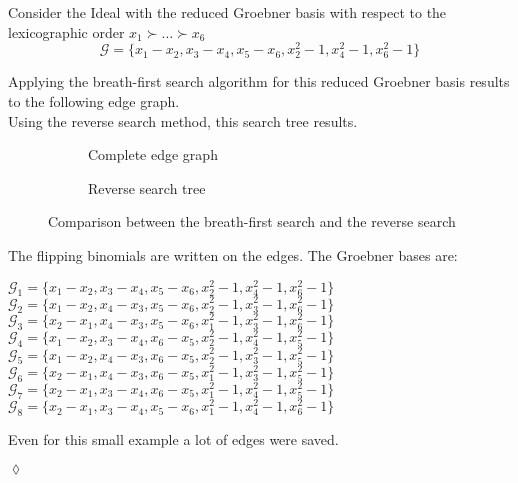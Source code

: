 \begin{env_example}\normalfont
Consider the Ideal with the reduced Groebner basis with respect to the lexicographic order $x_{1} \succ \ldots \succ x_{6} $
\[ \mathcal{G} = \{x_{1} - x_{2}, x_{3} - x_{4}, x_{5}-x_{6} , x_{2}^{2} -1 , x_{4}^{2} - 1, x_{6}^{2} - 1 \} \]

Applying the breath-first search algorithm for this reduced Groebner basis results to the following edge graph.\\


Using the reverse search method, this search tree results.


\begin{figure}
    \centering
    \begin{subfigure}[b]{0.48\linewidth}        %
        \centering
        
        \caption{Complete edge graph}
        \label{fig:A}
    \end{subfigure}
    \begin{subfigure}[b]{0.48\linewidth}        %
        \centering
        
        \caption{Reverse search tree}
        \label{fig:B}
    \end{subfigure}
    \caption{Comparison between the breath-first search and the reverse search}
    \label{fig:graph}
\end{figure}


The flipping binomials are written on the edges.
The Groebner bases are:
\begin{center}
$\mathcal{G}_{1} = \{x_{1}-x_{2},x_{3}-x_{4},x_{5}-x_{6},x_{2}^{2}-1,x_{4}^{2}-1,x_{6}^{2}-1 \} $ \\
$\mathcal{G}_{2} = \{x_{1}-x_{2},x_{4}-x_{3},x_{5}-x_{6},x_{2}^{2}-1,x_{3}^{2}-1,x_{6}^{2}-1 \} $ \\
$\mathcal{G}_{3} = \{x_{2}-x_{1},x_{4}-x_{3},x_{5}-x_{6},x_{1}^{2}-1,x_{3}^{2}-1,x_{6}^{2}-1 \} $ \\
$\mathcal{G}_{4} = \{x_{1}-x_{2},x_{3}-x_{4},x_{6}-x_{5},x_{2}^{2}-1,x_{4}^{2}-1,x_{5}^{2}-1 \} $ \\
$\mathcal{G}_{5} = \{x_{1}-x_{2},x_{4}-x_{3},x_{6}-x_{5},x_{2}^{2}-1,x_{3}^{2}-1,x_{5}^{2}-1 \} $ \\
$\mathcal{G}_{6} = \{x_{2}-x_{1},x_{4}-x_{3},x_{6}-x_{5},x_{1}^{2}-1,x_{3}^{2}-1,x_{5}^{2}-1 \} $ \\
$\mathcal{G}_{7} = \{x_{2}-x_{1},x_{3}-x_{4},x_{6}-x_{5},x_{1}^{2}-1,x_{4}^{2}-1,x_{5}^{2}-1 \} $ \\
$\mathcal{G}_{8} = \{x_{2}-x_{1},x_{3}-x_{4},x_{5}-x_{6},x_{1}^{2}-1,x_{4}^{2}-1,x_{6}^{2}-1 \} $ \\
\end{center}

Even for this small example a lot of edges were saved.
\begin{flushright}
$\lozenge$
\end{flushright}
\end{env_example}




